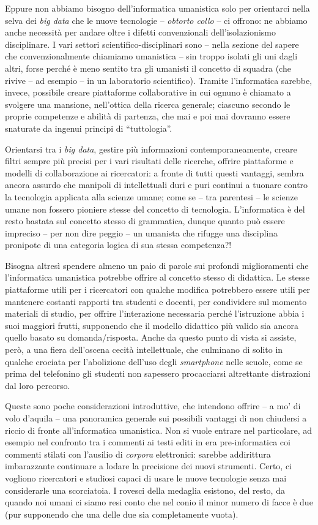 \documentclass[
  b5paper,
  twoside,
  12pt,
  chapterprefix=false,
  bibliography=totocnumbered,
  parskip=false]{scrbook}
\begin{document}
Eppure non abbiamo bisogno dell'informatica umanistica solo per
orientarci nella selva dei \emph{big data} che le nuove tecnologie --
\emph{obtorto collo} -- ci offrono: ne abbiamo anche necessità per andare
oltre i difetti convenzionali dell'isolazionismo disciplinare. I vari
settori scientifico-disciplinari sono -- nella sezione del sapere che
convenzionalmente chiamiamo umanistica -- sin troppo isolati gli uni
dagli altri, forse perché è meno sentito tra gli umanisti il concetto di
squadra (che rivive -- ad esempio -- in un laboratorio scientifico).
Tramite l'informatica sarebbe, invece, possibile creare piattaforme
collaborative in cui ognuno è chiamato a svolgere una mansione,
nell'ottica della ricerca generale; ciascuno secondo le proprie
competenze e abilità di partenza, che mai e poi mai dovranno essere
snaturate da ingenui principi di \enquote{tuttologia}.

Orientarsi tra i \emph{big data}, gestire più informazioni
contemporaneamente, creare filtri sempre più precisi per i vari
risultati delle ricerche, offrire piattaforme e modelli di
collaborazione ai ricercatori: a fronte di tutti questi vantaggi, sembra
ancora assurdo che manipoli di intellettuali duri e puri continui a
tuonare contro la tecnologia applicata alla scienze umane; come se --
tra parentesi -- le scienze umane non fossero pioniere stesse del
concetto di tecnologia. L'informatica è del resto bastata sul concetto
stesso di grammatica, dunque quanto può essere impreciso -- per non dire
peggio -- un umanista che rifugge una disciplina pronipote di una
categoria logica di sua stessa competenza?!

Bisogna altresì spendere almeno un paio di parole sui profondi
miglioramenti che l'informatica umanistica potrebbe offrire al concetto
stesso di didattica. Le stesse piattaforme utili per i ricercatori con
qualche modifica potrebbero essere utili per mantenere costanti rapporti
tra studenti e docenti, per condividere sul momento materiali di studio,
per offrire l'interazione necessaria perché l'istruzione abbia i suoi
maggiori frutti, supponendo che il modello didattico più valido sia
ancora quello basato su domanda/risposta. Anche da questo punto di vista
si assiste, però, a una fiera dell'oscena cecità intellettuale, che
culminano di solito in qualche crociata per l'abolizione dell'uso degli
\emph{smartphone} nelle scuole, come se prima del telefonino gli studenti non
sapessero procacciarsi altrettante distrazioni dal loro percorso.

Queste sono poche considerazioni introduttive, che intendono offrire --
a mo' di volo d'aquila -- una panoramica generale sui possibili vantaggi
di non chiudersi a riccio di fronte all'informatica umanistica. Non si
vuole entrare nel particolare, ad esempio nel confronto tra i commenti
ai testi editi in era pre-informatica coi commenti stilati con l'ausilio
di \emph{corpora} elettronici: sarebbe addirittura imbarazzante continuare a
lodare la precisione dei nuovi strumenti. Certo, ci vogliono ricercatori
e studiosi capaci di usare le nuove tecnologie senza mai considerarle
una scorciatoia. I rovesci della medaglia esistono, del resto, da quando
noi umani ci siamo resi conto che nel conio il minor numero di facce è
due (pur supponendo che una delle due sia completamente vuota).
\end{document}
